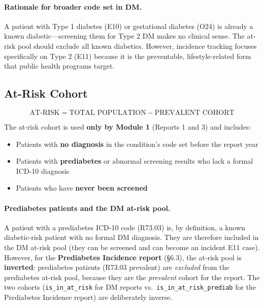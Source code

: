 \documentclass[11pt,a4paper]{article}
\begin{document}
\paragraph{Rationale for broader code set in DM.}
A patient with Type 1 diabetes (E10) or gestational diabetes (O24) is already a known diabetic---screening them for Type 2 DM makes no clinical sense. The at-risk pool should exclude all known diabetics. However, incidence tracking focuses specifically on Type 2 (E11) because it is the preventable, lifestyle-related form that public health programs target.

\subsection{At-Risk Cohort}

\begin{equation}
\text{AT-RISK} = \text{TOTAL POPULATION} - \text{PREVALENT COHORT}
\end{equation}

The at-risk cohort is used \textbf{only by Module 1} (Reports 1 and 3) and includes:
\begin{itemize}[leftmargin=*]
    \item Patients with \textbf{no diagnosis} in the condition's code set before the report year
    \item Patients with \textbf{prediabetes} or abnormal screening results who lack a formal ICD-10 diagnosis
    \item Patients who have \textbf{never been screened}
\end{itemize}

\paragraph{Prediabetes patients and the DM at-risk pool.}
A patient with a prediabetes ICD-10 code (R73.03) is, by definition, a known diabetic-risk patient with no formal DM diagnosis. They are therefore included in the DM at-risk pool (they can be screened and can become an incident E11 case). However, for the \textbf{Prediabetes Incidence report} (§6.3), the at-risk pool is \textbf{inverted}: prediabetes patients (R73.03 prevalent) are \emph{excluded} from the prediabetes at-risk pool, because they are the \emph{prevalent} cohort for the report. The two cohorts (\texttt{is\_in\_at\_risk} for DM reports vs.\ \texttt{is\_in\_at\_risk\_prediab} for the Prediabetes Incidence report) are deliberately inverse.
\end{document}
